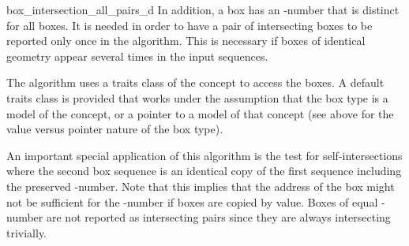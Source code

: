 \begin{ccRefFunction}{box_intersection_all_pairs_d}
In addition, a box has an -number that is distinct for
all boxes. It is needed in order to have a pair of intersecting boxes
to be reported only once in the algorithm. This is necessary if boxes
of identical geometry appear several times in the input sequences.

The algorithm uses a traits class of the 
concept to access the boxes. A default traits class is provided that
works under the assumption that the box type is a model of the
 concept, or a pointer to a model of that
concept (see above for the value versus pointer nature of the box type).

An important special application of this algorithm is the test for
self-intersections where the second box sequence is an identical copy
of the first sequence including the preserved -number. Note
that this implies that the address of the box might not be sufficient
for the -number if boxes are copied by value. Boxes of equal
-number are not reported as intersecting pairs since they are
always intersecting trivially.


 


\end{ccRefFunction}
